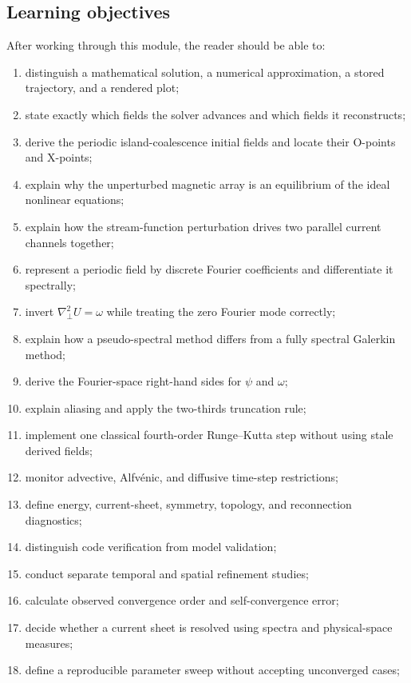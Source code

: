 \documentclass[11pt]{article}
\newcommand{\Lap}{\nabla_{\!\perp}^{2}}
\begin{document}
\subsection*{Learning objectives}

After working through this module, the reader should be able to:
\begin{enumerate}[label=\arabic*.]
  \item distinguish a mathematical solution, a numerical approximation, a stored trajectory, and a rendered plot;
  \item state exactly which fields the solver advances and which fields it reconstructs;
  \item derive the periodic island-coalescence initial fields and locate their O-points and X-points;
  \item explain why the unperturbed magnetic array is an equilibrium of the ideal nonlinear equations;
  \item explain how the stream-function perturbation drives two parallel current channels together;
  \item represent a periodic field by discrete Fourier coefficients and differentiate it spectrally;
  \item invert $\Lap U=\omega$ while treating the zero Fourier mode correctly;
  \item explain how a pseudo-spectral method differs from a fully spectral Galerkin method;
  \item derive the Fourier-space right-hand sides for $\psi$ and $\omega$;
  \item explain aliasing and apply the two-thirds truncation rule;
  \item implement one classical fourth-order Runge--Kutta step without using stale derived fields;
  \item monitor advective, Alfv\'enic, and diffusive time-step restrictions;
  \item define energy, current-sheet, symmetry, topology, and reconnection diagnostics;
  \item distinguish code verification from model validation;
  \item conduct separate temporal and spatial refinement studies;
  \item calculate observed convergence order and self-convergence error;
  \item decide whether a current sheet is resolved using spectra and physical-space measures;
  \item define a reproducible parameter sweep without accepting unconverged cases;

\end{enumerate}
\end{document}
